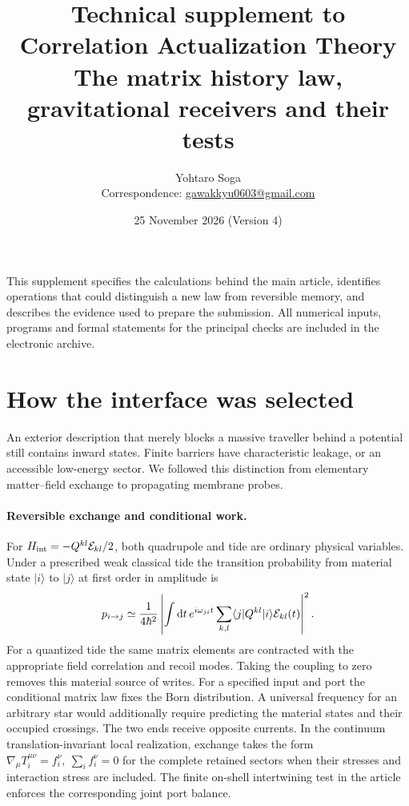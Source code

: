 \documentclass[11pt,a4paper]{article}
\title{\textbf{Technical supplement to Correlation Actualization Theory}\\[4pt]\large The matrix history law, gravitational receivers and their tests}
\author{Yohtaro Soga\\[-1pt]\small Correspondence: \href{mailto:gawakkyu0603@gmail.com}{gawakkyu0603@gmail.com}}
\date{25 November 2026 \quad(Version 4)}
\newcommand{\dd}{\mathrm d}
\begin{document}
\maketitle
\noindent This supplement specifies the calculations behind the main article, identifies operations that could distinguish a new law from reversible memory, and describes the evidence used to prepare the submission. All numerical inputs, programs and formal statements for the principal checks are included in the electronic archive.
\tableofcontents

\section{How the interface was selected}
An exterior description that merely blocks a massive traveller behind a potential still contains inward states. Finite barriers have characteristic leakage, or an accessible low-energy sector. We followed this distinction from elementary matter--field exchange to propagating membrane probes.

\paragraph{Reversible exchange and conditional work.}
For \(H_{\rm int}=-Q^{kl}{\cal E}_{kl}/2\), both quadrupole and tide are ordinary physical variables. Under a prescribed weak classical tide the transition probability from material state \(|i\rangle\) to \(|j\rangle\) at first order in amplitude is
\[
 p_{i\to j}\simeq \frac{1}{4\hbar^2}\left|
 \int\dd t\, e^{i\omega_{ji}t}\sum_{k,l}\langle j|Q^{kl}|i\rangle{\cal E}_{kl}(t)\right|^2 .
\]
For a quantized tide the same matrix elements are contracted with the appropriate field correlation and recoil modes. Taking the coupling to zero removes this material source of writes. For a specified input and port the conditional matrix law fixes the Born distribution. A universal frequency for an arbitrary star would additionally require predicting the material states and their occupied crossings. The two ends receive opposite currents. In the continuum translation-invariant local realization, exchange takes the form \(\nabla_\mu T_i^{\mu\nu}=f_i^\nu,\ \sum_i f_i^\nu=0\) for the complete retained sectors when their stresses and interaction stress are included. The finite on-shell intertwining test in the article enforces the corresponding joint port balance.
\end{document}
